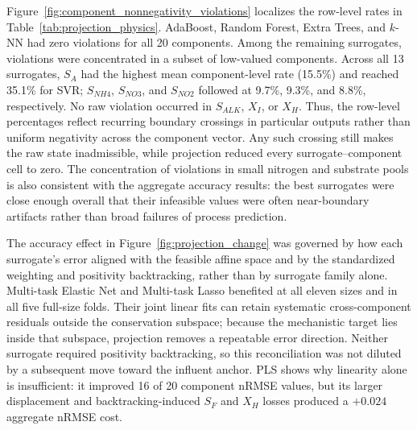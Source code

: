 \documentclass[a4paper,fleqn]{cas-sc}
\begin{document}
Figure~\ref{fig:component_nonnegativity_violations} localizes the row-level rates in Table~\ref{tab:projection_physics}. AdaBoost, Random Forest, Extra Trees, and $k$-NN had zero violations for all 20 components. Among the remaining surrogates, violations were concentrated in a subset of low-valued components. Across all 13 surrogates, $S_A$ had the highest mean component-level rate (15.5\%) and reached 35.1\% for SVR; $S_{NH4}$, $S_{NO3}$, and $S_{NO2}$ followed at 9.7\%, 9.3\%, and 8.8\%, respectively. No raw violation occurred in $S_{ALK}$, $X_I$, or $X_H$. Thus, the row-level percentages reflect recurring boundary crossings in particular outputs rather than uniform negativity across the component vector. Any such crossing still makes the raw state inadmissible, while projection reduced every surrogate--component cell to zero. The concentration of violations in small nitrogen and substrate pools is also consistent with the aggregate accuracy results: the best surrogates were close enough overall that their infeasible values were often near-boundary artifacts rather than broad failures of process prediction.

The accuracy effect in Figure~\ref{fig:projection_change} was governed by how each surrogate's error aligned with the feasible affine space and by the standardized weighting and positivity backtracking, rather than by surrogate family alone. Multi-task Elastic Net and Multi-task Lasso benefited at all eleven sizes and in all five full-size folds. Their joint linear fits can retain systematic cross-component residuals outside the conservation subspace; because the mechanistic target lies inside that subspace, projection removes a repeatable error direction. Neither surrogate required positivity backtracking, so this reconciliation was not diluted by a subsequent move toward the influent anchor. PLS shows why linearity alone is insufficient: it improved 16 of 20 component nRMSE values, but its larger displacement and backtracking-induced $S_F$ and $X_H$ losses produced a $+0.024$ aggregate nRMSE cost.
\end{document}
